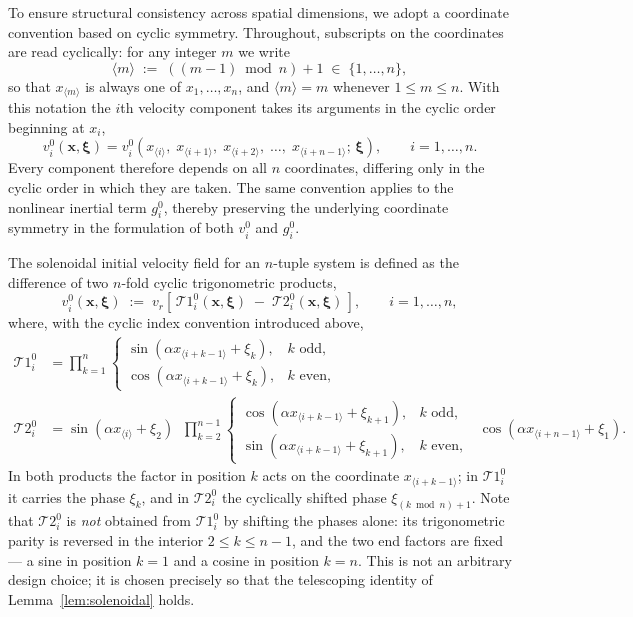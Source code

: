 \documentclass[11pt]{jfm}
\let\le=\leqslant  \let\leq=\leqslant
\numberwithin{equation}{section}
\begin{document}
To ensure structural consistency across spatial dimensions, we adopt a coordinate convention
based on cyclic symmetry. Throughout, subscripts on the coordinates are read cyclically: for any
integer $m$ we write
\[
\langle m\rangle \;:=\; \left((m-1)\bmod n\right)+1 \;\in\; \{1,\dots,n\},
\]
so that $x_{\langle m\rangle}$ is always one of $x_1,\dots,x_n$, and $\langle m\rangle = m$
whenever $1\le m\le n$. With this notation the $i$th velocity component takes its arguments in
the cyclic order beginning at $x_i$,
\[
v_i^0(\boldsymbol{x}, \boldsymbol{\xi}) = v_i^0\!\left(
x_{\langle i\rangle},\; x_{\langle i+1\rangle},\; x_{\langle i+2\rangle},\; \dots,\;
x_{\langle i+n-1\rangle};\, \boldsymbol{\xi}
\right), \qquad i = 1, \dots, n .
\]
Every component therefore depends on all $n$ coordinates, differing only in the cyclic order in
which they are taken. The same convention applies to the nonlinear inertial term
\( g_i^0 \), thereby preserving the underlying coordinate symmetry in the formulation of both
\( v_i^0 \) and \( g_i^0 \).

The solenoidal initial velocity field for an $n$-tuple system is defined as the difference
of two $n$-fold cyclic trigonometric products,
\begin{equation}
\label{3.1}
v_i^0(\boldsymbol{x}, \boldsymbol{\xi}) \;:=\; v_r\left[\,\mathcal{T}1_i^0(\boldsymbol{x},\boldsymbol{\xi})
\;-\; \mathcal{T}2_i^0(\boldsymbol{x},\boldsymbol{\xi})\,\right], \qquad i = 1,\dots,n,
\end{equation}
where, with the cyclic index convention introduced above,
\begin{subequations}
\begin{align}
\label{3.2a}
\mathcal{T}1_i^0 &= \prod_{k=1}^{n}
\begin{cases}
\sin\!\left( \alpha x_{\langle i+k-1\rangle} + \xi_k \right), & k \text{ odd},\\[2pt]
\cos\!\left( \alpha x_{\langle i+k-1\rangle} + \xi_k \right), & k \text{ even},
\end{cases}\\[6pt]
\label{3.2b}
\mathcal{T}2_i^0 &= \sin\!\left( \alpha x_{\langle i\rangle} + \xi_2 \right)
\;\;\prod_{k=2}^{n-1}
\begin{cases}
\cos\!\left( \alpha x_{\langle i+k-1\rangle} + \xi_{k+1} \right), & k \text{ odd},\\[2pt]
\sin\!\left( \alpha x_{\langle i+k-1\rangle} + \xi_{k+1} \right), & k \text{ even},
\end{cases}
\;\;\cos\!\left( \alpha x_{\langle i+n-1\rangle} + \xi_1 \right).
\end{align}
\end{subequations}
In both products the factor in position $k$ acts on the coordinate
$x_{\langle i+k-1\rangle}$; in $\mathcal{T}1_i^0$ it carries the phase $\xi_k$, and in $\mathcal{T}2_i^0$ the
cyclically shifted phase $\xi_{(k\bmod n)+1}$. Note that $\mathcal{T}2_i^0$ is \emph{not} obtained from
$\mathcal{T}1_i^0$ by shifting the phases alone: its trigonometric parity is reversed in the interior
$2\le k\le n-1$, and the two end factors are fixed --- a sine in position $k=1$ and a cosine
in position $k=n$. This is not an arbitrary design choice; it is chosen precisely so that the
telescoping identity of Lemma~\ref{lem:solenoidal} holds.
\end{document}
